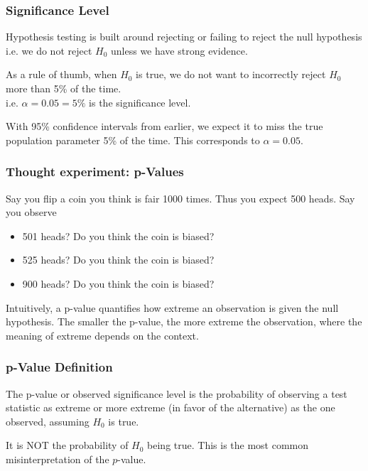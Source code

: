 \documentclass[handout]{beamer}
\newcommand{\blue}[1]{\textcolor{blue2}{#1}}
\begin{document}
\begin{frame}
\frametitle{Significance Level}
Hypothesis testing is built around rejecting or failing to reject the null hypothesis\\
\pause i.e. we do not reject $H_0$ unless we have \blue{strong evidence}.

\pause \vspace{0.5cm}

As a rule of thumb, when $H_0$ is true, we do not want to incorrectly reject $H_0$ more than 5\% of the time.\\
i.e. $\alpha = 0.05 = 5\%$ is the \blue{significance level}.  

\pause \vspace{0.5cm}

With 95\% confidence intervals from earlier, we expect it to miss the true population parameter 5\% of the time.  This corresponds to $\alpha=0.05$.   
\end{frame}


\begin{frame}
\frametitle{Thought experiment: p-Values}
Say you flip a coin you think is fair 1000 times.  Thus you expect 500 heads.   Say you observe
\begin{itemize}
\pause \item 501 heads? Do you think the coin is biased?
\pause \item 525 heads? Do you think the coin is biased?
\pause \item 900 heads? Do you think the coin is biased?
\end{itemize}
\pause Intuitively, a \blue{p-value} quantifies how \blue{extreme} an observation is given the null hypothesis.  
\vskip 0.25cm
\pause The smaller the p-value, the more \blue{extreme} the observation, where the meaning of extreme depends on the context.  
\end{frame}


\begin{frame}
\frametitle{p-Value Definition}
The \blue{p-value} or \blue{observed significance level} is the probability of observing a test statistic as extreme or more extreme (in favor of the alternative) as the one observed, assuming $H_0$ is true.

\vspace{0.5cm}

\pause It is \blue{NOT} the probability of $H_0$ being true.  This is the most common misinterpretation of the $p$-value.

\end{frame}
\end{document}
